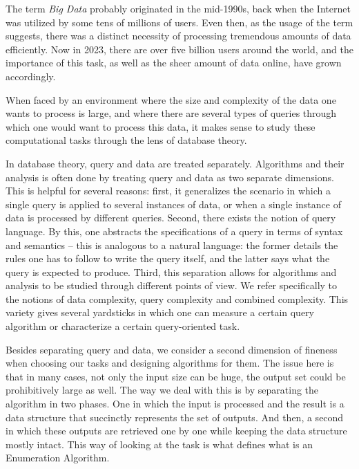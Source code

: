 The term {\it Big Data} probably originated in the mid-1990s, back when the Internet was utilized by some tens of millions of users. Even then, as the usage of the term suggests, there was a distinct necessity of processing tremendous amounts of data efficiently. Now in 2023, there are over five billion users around the world, and the importance of this task, as well as the sheer amount of data online, have grown accordingly.

When faced by an environment where the size and complexity of the data one wants to process is large, and where there are several types of queries through which one would want to process this data, it makes sense to study these computational tasks through the lens of database theory. 

In database theory, query and data are treated separately. Algorithms and their analysis is often done by treating query and data as two separate dimensions. This is helpful for several reasons: first, it generalizes the scenario in which a single query is applied to several instances of data, or when a single instance of data is processed by different queries. Second, there exists the notion of query language. By this, one abstracts the specifications of a query in terms of syntax and semantics -- this is analogous to a natural language: the former details the rules one has to follow to write the query itself, and the latter says what the query is expected to produce. Third, this separation allows for algorithms and analysis to be studied through different points of view. We refer specifically to the notions of data complexity, query complexity and combined complexity. This variety gives several yardsticks in which one can measure a certain query algorithm or characterize a certain query-oriented task.


Besides separating query and data, we consider a second dimension of fineness when choosing our tasks and designing algorithms for them. The issue here is that in many cases, not only the input size can be huge, the output set could be prohibitively large as well. The way we deal with this is by separating the algorithm in two phases. One in which the input is processed and the result is a data structure that succinctly represents the set of outputs. And then, a second in which these outputs are retrieved one by one while keeping the data structure mostly intact.
This way of looking at the task is what defines what is an Enumeration Algorithm.

